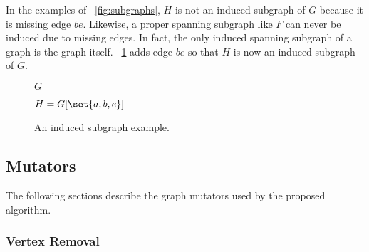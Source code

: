In the examples of \figurename~\ref{fig:subgraphs}, \(H\) is not an induced subgraph of \(G\) because it is missing
edge \(be\).  Likewise, a proper spanning subgraph like \(F\) can never be induced due to missing edges.  In fact,
the only induced spanning subgraph of a graph is the graph itself.  \figurename~\ref{fig:induced} adds edge \(be\)
so that \(H\) is now an induced subgraph of \(G\).

\begin{figure}[H]
  \begin{minipage}{2.75in}
    \centering

    \(G\)
  \end{minipage}
  \begin{minipage}{2.75in}
    \centering

    \(H=G[\set{a,b,e}]\)
  \end{minipage}
  \caption{An induced subgraph example.}
  \label{fig:induced}
\end{figure}

\subsection{Mutators}\label{sec:sub:mutators}

The following sections describe the graph mutators used by the proposed algorithm.

\subsubsection{Vertex Removal}\label{sec:sub:sub:vremove}

